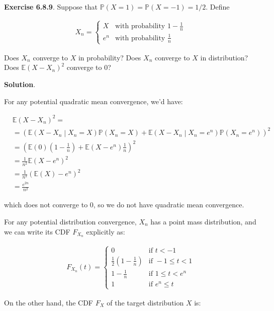 \textbf{Exercise 6.8.9}. Suppose that
\(\mathbb{P}(X = 1) = \mathbb{P}(X = -1) = 1/2\). Define

\begin{align*}  X_{n} =
    \begin{cases}
      X   & \text{with probability } 1 - \frac{1}{n}\\
      e^{n} & \text{with probability } \frac{1}{n}
    \end{cases}       
\end{align*}

Does \(X_{n}\) converge to \(X\) in probability? Does \(X_{n}\) converge to
\(X\) in distribution? Does \(\mathbb{E}(X - X_{n})^{2}\) converge to 0?

\textbf{Solution}.

For any potential quadratic mean convergence, we'd have:

\begin{align*}
&\mathbb{E}(X - X_{n})^{2} = \\
& = \left(\mathbb{E}(X - X_{n} \middle| X_{n} = X)\mathbb{P}(X_{n} = X) + \mathbb{E}(X - X_{n} \middle| X_{n} = e^{n})\mathbb{P}(X_{n} = e^{n}) \right)^{2} \\
& = \left(\mathbb{E}(0)\left(1 - \frac{1}{n} \right) + \mathbb{E}(X - e^{n})\frac{1}{n} \right)^{2} \\
& = \frac{1}{n^{2}} \mathbb{E}(X - e^{n})^{2} \\
& = \frac{1}{n^{2}} \left( \mathbb{E}(X) - e^{n}  \right)^{2} \\
& = \frac{e^{2n}}{n^{2}}
\end{align*}

which does not converge to 0, so we do not have quadratic mean
convergence.

For any potential distribution convergence, \(X_{n}\) has a point mass
distribution, and we can write its CDF \(F_{X_{n}}\) explicitly as:

\begin{align*}  F_{X_{n}}(t) =
    \begin{cases}
      0   & \text{if } t < -1 \\
      \frac{1}{2} \left(1 - \frac{1}{n}\right) & \text{if } -1 \leq t < 1 \\
      1 - \frac{1}{n} & \text{if } 1 \leq t < e^{n} \\
      1 & \text{if } e^{n} \leq t
    \end{cases}       
\end{align*}

On the other hand, the CDF \(F_X\) of the target distribution \(X\) is:

